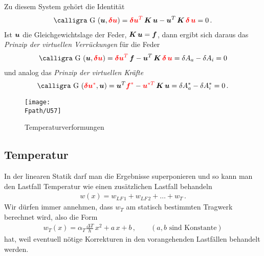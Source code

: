 {{{{Zu diesem System geh\"{o}rt die Identit\"{a}t
\begin{align}
\text{\normalfont\calligra G\,\,}(\vek u, \textcolor{red}{\vek  \delta \vek  u}) = \textcolor{red}{\vek \delta \vek u^T}\,\vek K\,\vek u - \vek u^T\,\vek K\,\textcolor{red}{\vek \delta \,\vek  u} = 0\,.
\end{align}
Ist $\mbox{\boldmath $u$} $ die Gleichgewichtslage der Feder, $\mbox{\boldmath $K$}\,\mbox{\boldmath $u$} = \mbox{\boldmath $f$}$, dann ergibt sich daraus das {\em Prinzip der virtuellen Verr\"{u}ckungen\/} f\"{u}r die Feder
\begin{align}
\text{\normalfont\calligra G\,\,}(\vek u, \textcolor{red}{\vek  \delta \vek  u}) = \textcolor{red}{\vek \delta \vek u^T}\,\vek f - \vek u^T\,\vek K\,\textcolor{red}{\vek \delta \,\vek  u} =\delta A_a - \delta A_i = 0
\end{align}
und analog das {\em Prinzip der virtuellen Kr\"{a}fte\/}
\begin{align}
\text{\normalfont\calligra G\,\,}(\textcolor{red}{\vek  \delta \vek  u^*},\vek  u) = \vek u^T \textcolor{red}{\vek f^{*}}- \textcolor{red}{\vek u^{*T}}\,\vek K\,\vek  u = \delta A_a^* - \delta A_i^* = 0\,.
\end{align}
\begin{figure}[tbp]
\centering
\if {} \sidecaption \fi
\texttt{[image: \\Fpath/U57]}
\caption{Temperaturverformungen} \label{U57}
\end{figure}%

{\textcolor{sectionTitleBlue}{\section{Temperatur}}}
In der linearen Statik darf man die Ergebnisse superponieren und so kann man den Lastfall Temperatur wie einen zus\"{a}tzlichen Lastfall behandeln
\begin{align}
w(x) = w_{LF\,1} + w_{LF\,2} + \ldots + w_{T}\,.
\end{align}
Wir d\"{u}rfen immer annehmen, dass $w_T$ am statisch bestimmten Tragwerk berechnet wird, also die Form
\begin{align}
w_T(x) = \alpha_T \frac{\Delta T}{h}\,x^2 + a\,x + b\,, \qquad (a, b\,\, \text{sind Konstante})
\end{align}
hat, weil eventuell n\"{o}tige Korrekturen in den vorangehenden Lastf\"{a}llen behandelt werden.

}}}}
